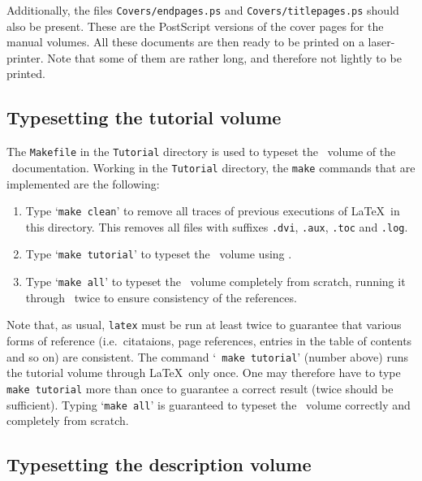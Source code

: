 \noindent Additionally, the files {\tt Covers/endpages.ps} and
{\tt Covers/titlepages.ps} should also be present.  These are the PostScript
versions of the cover pages for the manual volumes.  All these documents are
then ready to be printed on a laser-printer. Note
that some of them are rather long, and therefore not lightly to be printed.

\subsection{Typesetting the tutorial volume}

The {\tt Makefile} in the {\tt Tutorial} directory is used to typeset the
\TUTORIAL\ volume of the \HOL\ documentation.  Working in the {\tt Tutorial}
directory, the {\tt make} commands that are implemented are the following:

\begin{enumerate}

\item Type `{\tt make clean}' to remove all traces of previous executions of
\LaTeX\ in this directory.  This removes all files with suffixes {\tt .dvi},
{\tt .aux}, {\tt .toc} and {\tt .log}.

\item Type `{\tt make tutorial}' to typeset the \TUTORIAL\ volume using \latex.

\item Type `{\tt make all}' to typeset the \TUTORIAL\ volume completely from
scratch, running it through \latex\ twice to ensure consistency of the
references.

\end{enumerate}

\noindent Note that, as usual, {\tt latex} must be run at least twice to
guarantee that various forms of reference (i.e.\ citataions, page references,
entries in the table of contents and so on) are consistent.  The command `{\tt
make tutorial}' (number  above) runs the tutorial volume through
\LaTeX\ only once.  One may therefore have to type {\tt make tutorial} more
than once to guarantee a correct result (twice should be sufficient).  Typing
`{\tt make all}' is guaranteed to typeset the \TUTORIAL\ volume correctly and
completely from scratch.

\subsection{Typesetting the description volume}

